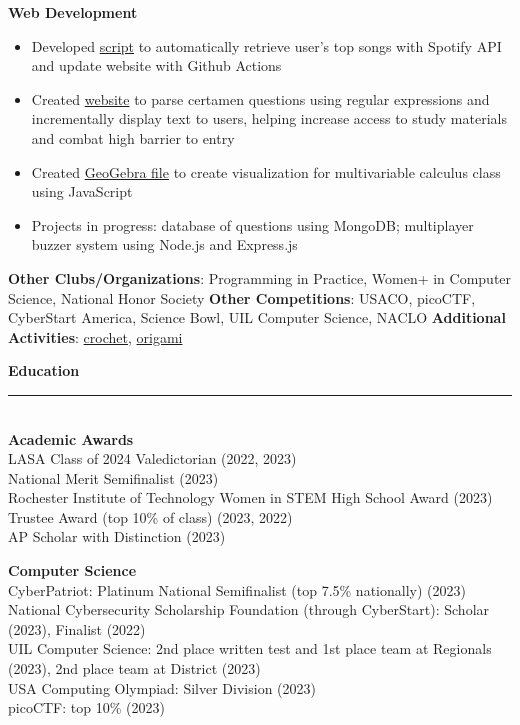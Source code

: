 \documentclass{article}
\begin{document}
\begin{flushleft}
    \textbf{Web Development}
    \begin{itemize}
        \setlength\itemsep{-.2em}
        \item Developed \href{https://github.com/ks4729/ks4729.github.io/blob/main/.github/workflows/Spotify_Content.yml}{script} to automatically retrieve user's top songs with Spotify API and update website with Github Actions
        \item Created \href{https://github.com/SapphireHue/Certamen-Buzzer}{website} to parse certamen questions using regular expressions and incrementally display text to users, helping increase access to study materials and combat high barrier to entry
        \item Created \href{https://www.geogebra.org/m/pmvspthz}{GeoGebra file} to create visualization for multivariable calculus class using JavaScript
        \item Projects in progress: database of questions using MongoDB; multiplayer buzzer system using Node.js and Express.js
    \end{itemize}

    \textbf{Other Clubs/Organizations}: Programming in Practice, Women+ in Computer Science, National Honor Society
    \textbf{Other Competitions}: USACO, picoCTF, CyberStart America, Science Bowl, UIL Computer Science, NACLO
    \textbf{Additional Activities}: \href{https://photos.app.goo.gl/tEm2jn1kG2grJVUn6}{crochet}, \href{https://photos.app.goo.gl/ZvdBS4s2AQgb9bm28}{origami}

    \vspace{11pt}
    \Large{\textbf{Education}} \normalsize
    \rule[10pt]{\textwidth}{0.4pt}\\[-.15in]
    \textbf{Academic Awards}\\
    LASA Class of 2024 Valedictorian (2022, 2023)\\
    National Merit Semifinalist (2023)\\
    Rochester Institute of Technology Women in STEM High School Award (2023)\\
    Trustee Award (top 10\% of class) (2023, 2022)\\
    AP Scholar with Distinction (2023)

    \vspace{11pt}
    \textbf{Computer Science}\\
    CyberPatriot: Platinum National Semifinalist (top 7.5\% nationally) (2023)\\
    National Cybersecurity Scholarship Foundation (through CyberStart): Scholar (2023), Finalist (2022)\\
    UIL Computer Science: 2nd place written test and 1st place team at Regionals (2023), 2nd place team at District (2023)\\
    USA Computing Olympiad: Silver Division (2023)\\
    picoCTF: top 10\% (2023)\\


\end{flushleft}
\end{document}
